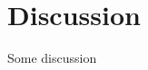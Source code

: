 \chapter{Discussion}
\label{ch:discussion}
\begin{refsection}[discussion]

Some discussion \cite{Einstein1905:2}

\FloatBarrier
\printbibliography[heading=subbibnumbered, title={Bibliography}]
\end{refsection}
 